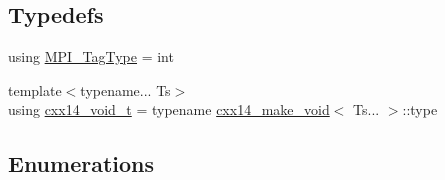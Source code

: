 \subsection*{Typedefs}
\begin{DoxyCompactItemize}
\item 
using \hyperlink{namespacevt_1_1messaging_af700cb74b7b97c1a305267a9eb3ba91a}{M\+P\+I\+\_\+\+Tag\+Type} = int
\item 
{\footnotesize template$<$typename... Ts$>$ }\\using \hyperlink{namespacevt_1_1messaging_a9724e719b301289eb8b3afbf9c44cf46}{cxx14\+\_\+void\+\_\+t} = typename \hyperlink{structvt_1_1messaging_1_1cxx14__make__void}{cxx14\+\_\+make\+\_\+void}$<$ Ts... $>$\+::type
\end{DoxyCompactItemize}
\subsection*{Enumerations}
